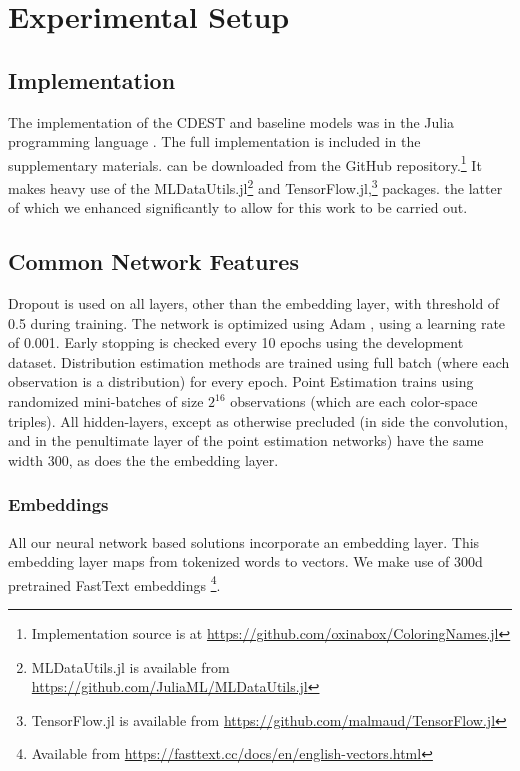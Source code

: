 \documentclass[11pt,a4paper]{article}
\newcommand{\parencite}{\citep}
\newcommand{\textcite}{\citet}
\begin{document}
\section{Experimental Setup}

\subsection{Implementation}
The implementation of the CDEST and baseline models was in the Julia programming language \parencite{Julia}.
The full implementation is included in the supplementary materials.
can be downloaded from the GitHub repository.\footnote{Implementation source is at \url{https://github.com/oxinabox/ColoringNames.jl}}
It makes heavy use of the MLDataUtils.jl\footnote{MLDataUtils.jl is available from \url{https://github.com/JuliaML/MLDataUtils.jl}} and TensorFlow.jl,\footnote{TensorFlow.jl is available from \url{https://github.com/malmaud/TensorFlow.jl}} packages.
the latter of which we enhanced significantly to allow for this work to be carried out.


\subsection{Common Network Features}
Dropout\parencite{srivastava2014dropout}  is used on all layers, other than the embedding layer, with threshold of 0.5 during training.
The network is optimized using Adam
\cite{kingma2014adam}, using a learning rate of 0.001.
Early stopping is checked every 10 epochs using the development dataset.
Distribution estimation methods are trained using full batch (where each observation is a distribution) for every epoch.
Point Estimation trains using randomized mini-batches of size $2^16$ observations (which are each color-space triples).
All hidden-layers, except as otherwise precluded (in side the convolution, and in the penultimate layer of the point estimation networks) have the same width 300, as does the the embedding layer.


\subsubsection{Embeddings}\label{sec:embeddings} 
All our neural network based solutions incorporate an embedding layer.
This embedding layer maps from tokenized words to vectors.
We make use of 300d pretrained FastText embeddings \textcite{bojanowski2016enriching}\footnote{Available from \url{https://fasttext.cc/docs/en/english-vectors.html}}.
\end{document}
